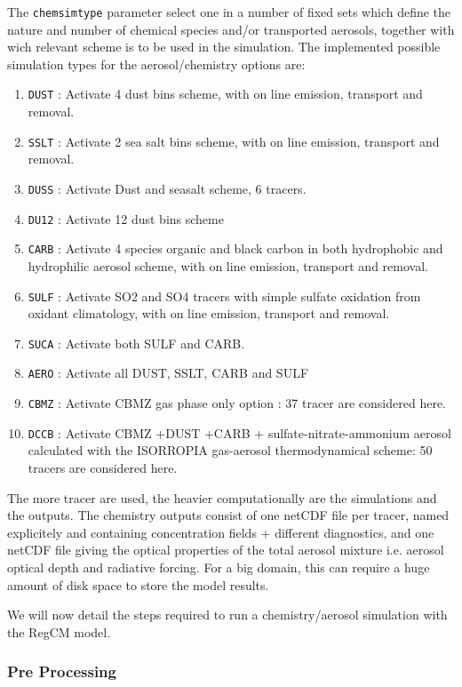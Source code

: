 The \verb=chemsimtype= parameter select one in a number of fixed sets which
define the nature and number of chemical species and/or transported aerosols,
together with wich relevant scheme is to be used in the simulation.
The implemented possible simulation types for the aerosol/chemistry options
are:

\begin{enumerate}
  \item \verb=DUST= : Activate 4 dust bins scheme, with on line emission,
    transport and removal.
  \item \verb=SSLT= : Activate 2 sea salt bins scheme, with on line emission,
    transport and removal.
  \item \verb=DUSS= : Activate Dust and seasalt scheme, 6 tracers.
  \item \verb=DU12= : Activate 12 dust bins scheme
  \item \verb=CARB= : Activate 4 species organic and black carbon in both
    hydrophobic and hydrophilic aerosol scheme, with on line emission,
    transport and removal.
  \item \verb=SULF= : Activate SO2 and SO4 tracers with simple sulfate
    oxidation from oxidant climatology, with on line emission,
    transport and removal.
  \item \verb=SUCA= : Activate both SULF and CARB.
  \item \verb=AERO= : Activate all DUST, SSLT, CARB and SULF
  \item \verb=CBMZ= : Activate CBMZ gas phase only option : 37 tracer are
    considered here.
  \item \verb=DCCB= : Activate CBMZ +DUST +CARB 
         + sulfate-nitrate-ammonium aerosol calculated with the ISORROPIA 
         gas-aerosol thermodynamical scheme: 50 tracers are considered here.
\end{enumerate}

The more tracer are used, the heavier computationally are the simulations and
the outputs. The chemistry outputs consist of one netCDF file per tracer,
named explicitely and containing concentration fields + different diagnostics,
and one netCDF file giving the optical properties of the total aerosol mixture
i.e. aerosol optical depth and radiative forcing. For a big domain, this can
require a huge amount of disk space to store the model results.

We will now detail the steps required to run a chemistry/aerosol simulation with
the RegCM model.

\subsubsection{Pre Processing}

